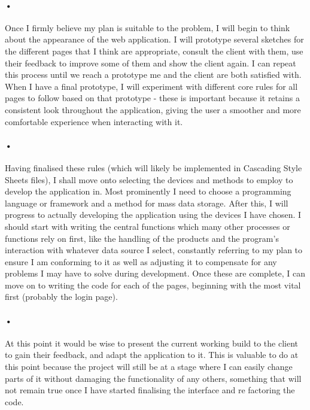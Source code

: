 \documentclass{article}
\begin{document}
    \paragraph{•}
    Once I firmly believe my plan is suitable to the problem, I will begin to think about the appearance of the web application.
    I will prototype several sketches for the different pages that I think are appropriate, consult the client with them, use their feedback to improve some of them and show the client again.
    I can repeat this process until we reach a prototype me and the client are both satisfied with.
    When I have a final prototype, I will experiment with different core rules for all pages to follow based on that prototype - these is important because it retains a consistent look throughout the application, giving the user a smoother and more comfortable experience when interacting with it.
    \paragraph{•}
    Having finalised these rules (which will likely be implemented in Cascading Style Sheets files), I shall move onto selecting the devices and methods to employ to develop the application in.
    Most prominently I need to choose a programming language or framework and a method for mass data storage.
    After this, I will progress to actually developing the application using the devices I have chosen.
    I should start with writing the central functions which many other processes or functions rely on first, like the handling of the products and the program's interaction with whatever data source I select, constantly referring to my plan to ensure I am conforming to it as well as adjusting it to compensate for any problems I may have to solve during development.
    Once these are complete, I can move on to writing the code for each of the pages, beginning with the most vital first (probably the login page).
    \paragraph{•}
    At this point it would be wise to present the current working build to the client to gain their feedback, and adapt the application to it.
    This is valuable to do at this point because the project will still be at a stage where I can easily change parts of it without damaging the functionality of any others, something that will not remain true once I have started finalising the interface and re factoring the code.
\end{document}
